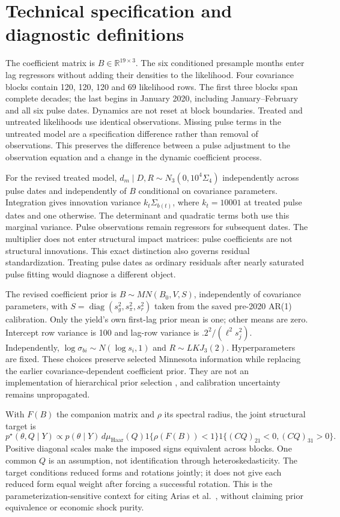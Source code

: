 \documentclass[11pt,a4paper]{article}
\begin{document}
\appendix
\section{Technical specification and diagnostic definitions}
The coefficient matrix is $B\in\mathbb R^{19\times3}$. The six conditioned presample months enter lag regressors without adding their densities to the likelihood. Four covariance blocks contain 120, 120, 120 and 69 likelihood rows. The first three blocks span complete decades; the last begins in January 2020, including January--February and all six pulse dates. Dynamics are not reset at block boundaries. Treated and untreated likelihoods use identical observations. Missing pulse terms in the untreated model are a specification difference rather than removal of observations. This preserves the difference between a pulse adjustment to the observation equation and a change in the dynamic coefficient process.

For the revised treated model, $d_m\mid D,R\sim N_3(0,10^4\Sigma_4)$ independently across pulse dates and independently of $B$ conditional on covariance parameters. Integration gives innovation variance $k_t\Sigma_{b(t)}$, where $k_t=10001$ at treated pulse dates and one otherwise. The determinant and quadratic terms both use this marginal variance. Pulse observations remain regressors for subsequent dates. The multiplier does not enter structural impact matrices: pulse coefficients are not structural innovations. This exact distinction also governs residual standardization. Treating pulse dates as ordinary residuals after nearly saturated pulse fitting would diagnose a different object.

The revised coefficient prior is $B\sim MN(B_0,V,S)$, independently of covariance parameters, with $S=\operatorname{diag}(s_g^2,s_\pi^2,s_r^2)$ taken from the saved pre-2020 AR(1) calibration. Only the yield's own first-lag prior mean is one; other means are zero. Intercept row variance is 100 and lag-row variance is $.2^2/(\ell^2s_j^2)$. Independently, $\log\sigma_{bi}\sim N(\log s_i,1)$ and $R\sim LKJ_3(2)$. Hyperparameters are fixed. These choices preserve selected Minnesota information while replacing the earlier covariance-dependent coefficient prior. They are not an implementation of hierarchical prior selection \cite{glp2015}, and calibration uncertainty remains unpropagated.

With $F(B)$ the companion matrix and $\rho$ its spectral radius, the joint structural target is
\[
 p^\star(\theta,Q\mid Y)\propto p(\theta\mid Y)\,d\mu_{\mathrm{Haar}}(Q)
 1\{\rho(F(B))<1\}1\{(CQ)_{21}<0,(CQ)_{31}>0\}.
\]
Positive diagonal scales make the imposed signs equivalent across blocks. One common $Q$ is an assumption, not identification through heteroskedasticity. The target conditions reduced forms and rotations jointly; it does not give each reduced form equal weight after forcing a successful rotation. This is the parameterization-sensitive context for citing Arias et al.\ \cite{arw2018}, without claiming prior equivalence or economic shock purity.
\end{document}
